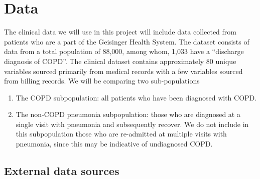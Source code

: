 \documentclass{article}
\begin{document}
\section{Data}

The clinical data we will use in this project will include data collected from 
patients who are a part of the Geisinger Health System. The dataset consists of 
data from a total population of 88,000, among whom, 1,033 have 
a ``discharge diagnosis of COPD''. The clinical dataset contains approximately 
80 unique variables sourced primarily from medical records with a few variables 
sourced from billing records. We will be comparing two sub-populations

\begin{enumerate}
\item The COPD subpopulation: all patients who have been diagnosed with COPD.
\item The non-COPD pneumonia subpopulation: those who are diagnosed at a single 
visit with pneumonia and subsequently recover. We do not include in this 
subpopulation those who are re-admitted at multiple visits with pneumonia, 
since this may be indicative of undiagnosed COPD.
\end{enumerate}

\subsection{External data sources}
\end{document}
